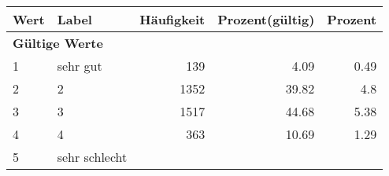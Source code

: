      \begin{longtable}{lXrrr}
     \toprule
     \textbf{Wert} & \textbf{Label} & \textbf{Häufigkeit} & \textbf{Prozent(gültig)} & \textbf{Prozent} \\
     \endhead
     \midrule
     \multicolumn{5}{l}{\textbf{Gültige Werte}}\\

     1 &
     \multicolumn{1}{X}{ sehr gut   } &


       \num{139} &
       \num[round-mode=places,round-precision=2]{4.09} &
         \num[round-mode=places,round-precision=2]{0.49} \\

     2 &
     \multicolumn{1}{X}{ 2   } &


       \num{1352} &
       \num[round-mode=places,round-precision=2]{39.82} &
         \num[round-mode=places,round-precision=2]{4.8} \\

     3 &
     \multicolumn{1}{X}{ 3   } &


       \num{1517} &
       \num[round-mode=places,round-precision=2]{44.68} &
         \num[round-mode=places,round-precision=2]{5.38} \\

     4 &
     \multicolumn{1}{X}{ 4   } &


       \num{363} &
       \num[round-mode=places,round-precision=2]{10.69} &
         \num[round-mode=places,round-precision=2]{1.29} \\

     5 &
     \multicolumn{1}{X}{ sehr schlecht   } &



\end{longtable}
